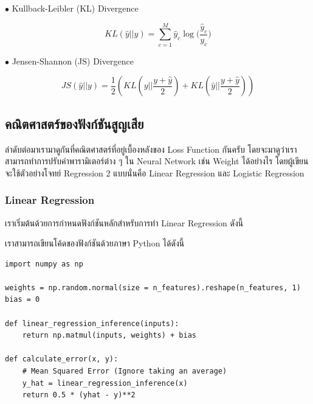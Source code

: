 \noindent $\bullet$ Kullback-Leibler (KL) Divergence

\begin{equation}
    KL(\hat{y} || y) = \sum_{c=1}^{M}\hat{y}_c \log \bigg( {\frac{\hat{y}_c}{y_c}} \bigg)
\end{equation}

\noindent $\bullet$ Jensen-Shannon (JS) Divergence

\begin{equation}
    JS(\hat{y} || y) = \frac{1}{2}(KL(y||\frac{y+\hat{y}}{2}) + KL(\hat{y}||\frac{y+\hat{y}}{2}))
\end{equation}

\subsection{คณิตศาสตร์ของฟังก์ชันสูญเสีย}

ลำดับต่อมาเรามาดูกันที่คณิตศาสตร์ที่อยู่เบื้องหลังของ Loss Function กันครับ โดยจะมาดูว่าเราสามารถทำการปรับค่าพารามิเตอร์ต่าง ๆ ใน Neural 
Network เช่น Weight ได้อย่างไร โดยผู้เขียนจะใช้ตัวอย่างโจทย์ Regression 2 แบบนั่นคือ Linear Regression และ Logistic Regression

\subsubsection{Linear Regression}

เราเริ่มต้นด้วยการกำหนดฟังก์ชันหลักสำหรับการทำ Linear Regression ดังนี้


เราสามารถเขียนโค้ดของฟังก์ชันด้วยภาษา Python ได้ดังนี้

\begin{lstlisting}[style=MyPython]
import numpy as np

weights = np.random.normal(size = n_features).reshape(n_features, 1)
bias = 0

def linear_regression_inference(inputs):
    return np.matmul(inputs, weights) + bias   

def calculate_error(x, y):
    # Mean Squared Error (Ignore taking an average)
    y_hat = linear_regression_inference(x)
    return 0.5 * (yhat - y)**2 
\end{lstlisting}

